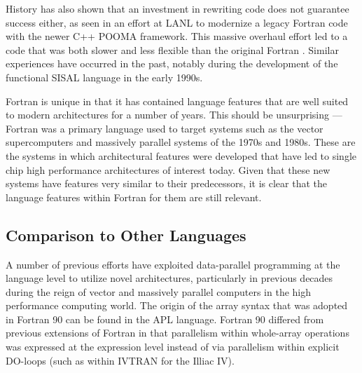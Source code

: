 

History has also shown that an investment in rewriting code does not
guarantee success either, as seen in an effort at LANL to modernize a
legacy Fortran code with the newer C++ POOMA framework.  This
massive overhaul effort led to a code that was both slower and less
flexible than the original Fortran \cite{basili08hpc}.  Similar
experiences have occurred in the past, notably during the development
of the functional SISAL language in the early 1990s.

Fortran is unique in that it has contained language features that are
well suited to modern architectures for a number of years.  This
should be unsurprising --- Fortran was a primary language used to
target systems such as the vector supercomputers and massively
parallel systems of the 1970s and 1980s.  These are the systems in
which architectural features were developed that have led to single
chip high performance architectures of interest today.  Given that
these new systems have features very similar to their predecessors, it
is clear that the language features within Fortran for them are still
relevant.

\subsection{Comparison to Other Languages}

A number of previous efforts have exploited data-parallel programming
at the language level to utilize novel architectures, particularly in
previous decades during the reign of vector and massively parallel
computers in the high performance computing world.  The origin of the
array syntax that was adopted in Fortran 90 can be found in the APL
language.  Fortran 90 differed from previous %
extensions of Fortran in that parallelism within whole-array
operations was expressed at the expression level instead of via
parallelism within explicit DO-loops (such as within IVTRAN for the
Illiac IV).

